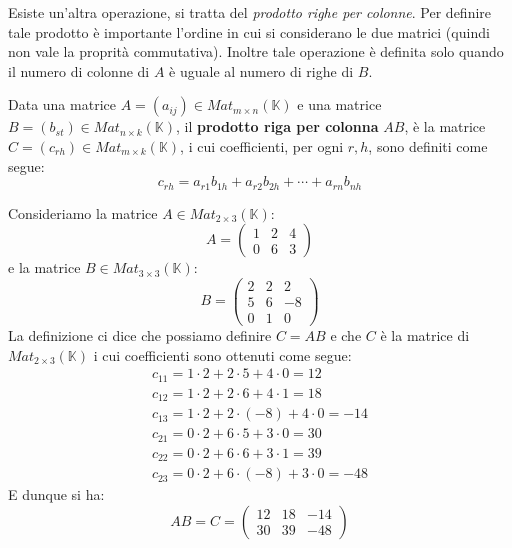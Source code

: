 Esiste un'altra operazione, si tratta del
\emph{prodotto righe per colonne}. Per definire tale prodotto \`e
importante l'ordine in cui si considerano le due matrici (quindi non vale la
proprit\`a commutativa). Inoltre tale operazione \`e definita solo quando il
numero di colonne di $A$ \`e uguale al numero di righe di $B$.

\begin{defn}
	Data una matrice $A = (a_{ij}) \in Mat_{m \times n} (\mathbb{K})$ e una
	matrice $B = (b_{st}) \in Mat_{n \times k} (\mathbb{K})$, il
	\textbf{prodotto riga per colonna} $AB$, \`e la matrice
	$C = (c_{rh}) \in Mat_{m \times k} (\mathbb{K})$, i cui coefficienti,
	per ogni $r, h$, sono definiti come segue:
	\begin{equation*}
		c_{rh} = a_{r1} b_{1h} + a_{r2} b_{2h} + \cdots + a_{rn} b_{nh}
	\end{equation*}
\end{defn}

\begin{example}
	Consideriamo la matrice $A \in Mat_{2 \times 3}(\mathbb{K})$:
	\begin{equation*}
		A = \begin{pmatrix}
			1 & 2 & 4 \\
			0 & 6 & 3
		\end{pmatrix}
	\end{equation*}
	e la matrice $B \in Mat_{3 \times 3}(\mathbb{K})$:
	\begin{equation*}
		B = \begin{pmatrix}
			2 & 2 & 2  \\
			5 & 6 & -8 \\
			0 & 1 & 0
		\end{pmatrix}
	\end{equation*}
	La definizione ci dice che possiamo definire $C = AB$ e che $C$ \`e la matrice di
	$Mat_{2 \times 3}(\mathbb{K})$ i cui coefficienti sono ottenuti come segue:
	\begin{gather*}
		c_{11} = 1 \cdot 2 + 2 \cdot 5 + 4 \cdot 0 = 12 \\
		c_{12} = 1 \cdot 2 + 2 \cdot 6 + 4 \cdot 1 = 18 \\
		c_{13} = 1 \cdot 2 + 2 \cdot (-8) + 4 \cdot 0 = -14 \\
		c_{21} = 0 \cdot 2 + 6 \cdot 5 + 3 \cdot 0 = 30 \\
		c_{22} = 0 \cdot 2 + 6 \cdot 6 + 3 \cdot 1 = 39 \\
		c_{23} = 0 \cdot 2 + 6 \cdot (-8) + 3 \cdot 0 = -48
	\end{gather*}
	E dunque si ha:
	\begin{equation*}
		AB = C = \begin{pmatrix}
			12 & 18 & -14 \\
			30 & 39 & -48
		\end{pmatrix}
	\end{equation*}
\end{example}

